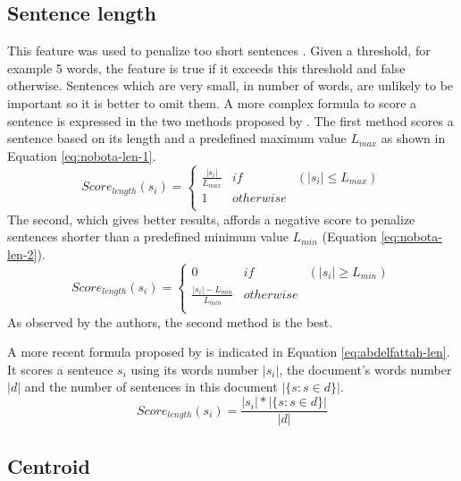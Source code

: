 \subsection{Sentence length}

This feature was used to penalize too short sentences \citep{95-kupiec-al}.
Given a threshold, for example 5 words, the feature is true if it exceeds this threshold and false otherwise.
Sentences which are very small, in number of words, are unlikely to be important so it is better to omit them.
A more complex formula to score a sentence is expressed in the two methods proposed by \citet{04-nobata-sekine}.
The first method scores a sentence based on its length and a predefined maximum value $ L_{max} $ as shown in Equation \ref{eq:nobota-len-1}.
\begin{equation}
\label{eq:nobota-len-1}
Score_{length}(s_i) = \left\lbrace 
\begin{array}{lll}
\frac{|s_i|}{L_{max}} & if & (|s_i| \leq L_{max}) \\
1 & otherwise & \\
\end{array}
\right. 
\end{equation}
The second, which gives better results, affords a negative score to penalize sentences shorter than a predefined minimum value $ L_{min}$ (Equation \ref{eq:nobota-len-2}).
\begin{equation}
\label{eq:nobota-len-2}
Score_{length}(s_i) = \left\lbrace 
\begin{array}{lll}
0 & if & (|s_i| \geq L_{min}) \\
\frac{|s_i| - L_{min}}{L_{min}} & otherwise & \\
\end{array}
\right. 
\end{equation}
As observed by the authors, the second method is the best.

A more recent formula proposed by \citet{09-abdelfattah-ren} is indicated in Equation \ref{eq:abdelfattah-len}.
It scores a sentence $ s_i $ using its words number $ |s_i| $, the document's words number $ |d| $ and the number of sentences in this document $ |\{s: s \in d\}| $.
\begin{equation}
	\label{eq:abdelfattah-len}
	Score_{length}(s_i) = \frac{|s_i| * |\{s: s \in d\}|}{|d|}
\end{equation} 


\subsection{Centroid}

